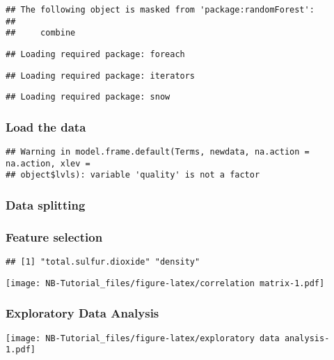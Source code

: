 \documentclass[
]{article}
\begin{document}
\begin{verbatim}
## The following object is masked from 'package:randomForest':
## 
##     combine
\end{verbatim}

\begin{verbatim}
## Loading required package: foreach
\end{verbatim}

\begin{verbatim}
## Loading required package: iterators
\end{verbatim}

\begin{verbatim}
## Loading required package: snow
\end{verbatim}

\hypertarget{load-the-data}{%
\subsubsection{Load the data}\label{load-the-data}}

\begin{verbatim}
## Warning in model.frame.default(Terms, newdata, na.action = na.action, xlev =
## object$lvls): variable 'quality' is not a factor
\end{verbatim}

\hypertarget{data-splitting}{%
\subsubsection{Data splitting}\label{data-splitting}}

\hypertarget{feature-selection}{%
\subsubsection{Feature selection}\label{feature-selection}}

\begin{verbatim}
## [1] "total.sulfur.dioxide" "density"
\end{verbatim}

\texttt{[image: NB-Tutorial\_files/figure-latex/correlation matrix-1.pdf]}

\hypertarget{exploratory-data-analysis}{%
\subsubsection{Exploratory Data
Analysis}\label{exploratory-data-analysis}}

\texttt{[image: NB-Tutorial\_files/figure-latex/exploratory data analysis-1.pdf]}
\end{document}
